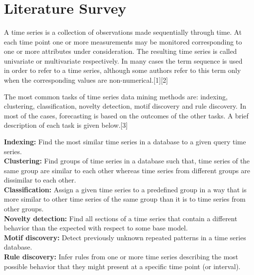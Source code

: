 \documentclass[12pt,a4paper]{report}
\begin{document}
\section{Literature Survey}
\paragraph{} A time series is a collection of observations made sequentially through time. At each time point one or more measurements may be monitored corresponding to one or more attributes under consideration. The resulting time series is called univariate or multivariate respectively. In many cases the term sequence is used in order to refer to a time series, although some authors refer to this term only when the corresponding values are non-numerical.[1][2]




The most common tasks of time series data mining methods are: indexing, clustering, classification, novelty detection, motif discovery and rule discovery. In most of the cases, forecasting is based on the outcomes of the other tasks. A brief description of each task is given below.[3]

\noindent
\textbf{Indexing:} Find the most similar time series in a database to a given query time series.\\
\textbf{Clustering:} Find groups of time series in a database such that, time series of the same group are similar to each other whereas time series from different groups are dissimilar to each other.\\
\textbf{Classification:} Assign a given time series to a predefined group in a way that is more similar to other time series of the same group than it is to time series from other groups.\\
\textbf{Novelty detection:} Find all sections of a time series that contain a different behavior than the expected with respect to some base model.\\
\textbf{Motif discovery:} Detect previously unknown repeated patterns in a time series database.\\
\textbf{Rule discovery:} Infer rules from one or more time series describing the most possible behavior that they might present at a specific time point (or interval).\\
\end{document}
